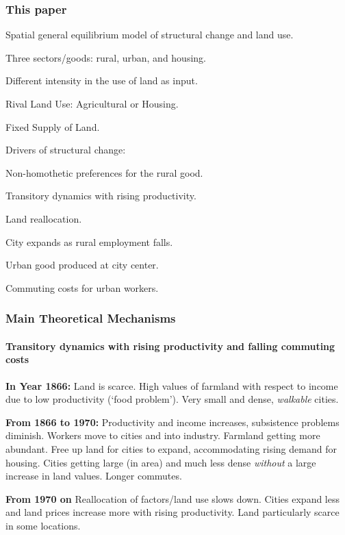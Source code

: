 \documentclass[aspectratio=169]{beamer}
\begin{document}
\begin{frame}
	\frametitle{This paper}
	\medskip	
	\hspace{-0.2cm}Spatial general equilibrium model of structural change and land use.
	\medskip
	\bi
	\item Three sectors/goods: rural, urban, and housing.
	\smallskip
	\bi
	\item Different intensity in the use of land as input.
	\smallskip
	\item Rival Land Use: Agricultural or Housing.	
	\smallskip
	\item Fixed Supply of Land.
	\ei
	\bigskip
	\item Drivers of structural change:
	\smallskip
	\bi 
	\item Non-homothetic preferences for the rural good.
	\smallskip
	\item Transitory dynamics with rising productivity.
	\ei

	\bigskip
	\item Land reallocation.
	\smallskip
	\bi
	\item City expands as rural employment falls.
	\smallskip
	\item Urban good produced at city center.
	\smallskip
	\item Commuting costs for urban workers.
	\ei
	\ei
\end{frame}



\begin{frame}
\frametitle{Main Theoretical Mechanisms}
\framesubtitle{Transitory dynamics with rising productivity and falling commuting costs}

\begin{widei}
\item \textbf{In Year 1866:} Land is scarce. High values of farmland with respect to income due to low productivity (`food problem'). Very small and dense, \emph{walkable} cities.
\item \textbf{From 1866 to 1970:} Productivity and income increases, subsistence problems diminish. Workers move to cities and into industry. Farmland getting more abundant. Free up land for cities to expand, accommodating rising demand for housing. Cities getting large (in area) and much less dense \emph{without} a large increase in land values. Longer commutes.
\item \textbf{From 1970 on} Reallocation of factors/land use slows down. Cities expand less and land prices increase more with rising productivity. Land particularly scarce in some locations.
\end{widei}
\end{frame}
\end{document}
